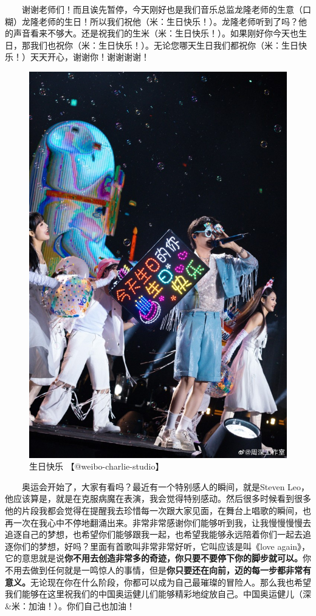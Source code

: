 \documentclass[]{ctexbook}
\begin{document}
  谢谢老师们！而且诶先暂停，今天刚好也是我们音乐总监龙隆老师的生意（口糊）龙隆老师的生日！所以我们祝他（米：生日快乐！）。龙隆老师听到了吗？他的声音看来不够大。还是祝我们的生米（米：生日快乐！）。如果刚好你今天也生日，那我们也祝你（米：生日快乐！）。无论您哪天生日我们都祝你（米：生日快乐！）天天开心，谢谢你！谢谢谢谢！

\begin{figure}

{\centering \includegraphics[width=400pt]{img/wuhan20240727/001} 

}

\caption{生日快乐 【@weibo-charlie-studio】}\label{fig:unnamed-chunk-60}
\end{figure}

  奥运会开始了，大家有看吗？最近有一个特别感人的瞬间，就是Steven Leo，他应该算是，就是在克服病魔在表演，我会觉得特别感动。然后很多时候看到很多他的片段我都会觉得在提醒我去珍惜每一次跟大家见面，在舞台上唱歌的瞬间，也再一次在我心中不停地翻涌出来。非常非常感谢你们能够听到我，让我慢慢慢慢去追逐自己的梦想，也希望你们能够跟我一起，也希望我能够永远陪着你们一起去追逐你们的梦想，好吗？里面有首歌叫非常非常好听，它叫应该是叫《love again》，它的意思就是说\textbf{你不用去创造非常多的奇迹，你只要不要停下你的脚步就可以。}你不用去做到任何就是一鸣惊人的事情，但是\textbf{你只要还在向前，迈的每一步都非常有意义。}无论现在你在什么阶段，你都可以成为自己最璀璨的冒险人。那么我也希望我们能够在这里祝我们的中国奥运健儿们能够精彩地绽放自己。中国奥运健儿（深\&米：加油！）。你们自己也加油！
\end{document}
